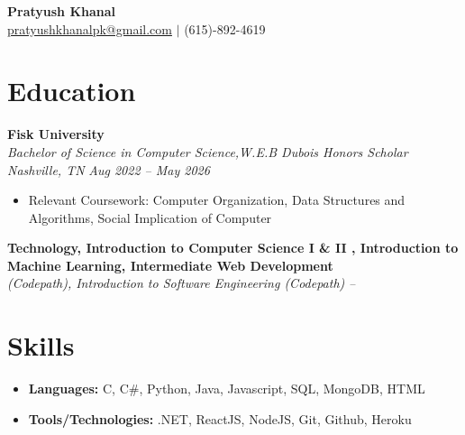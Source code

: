 \documentclass[letterpaper,10pt]{article}
\begin{document}
\begin{center}
  {\LARGE\bfseries\color{accent} Pratyush Khanal} \\[4pt]
  \small
  \href{mailto:pratyushkhanalpk@gmail.com}{pratyushkhanalpk@gmail.com}   $|$ (615)-892-4619      \end{center}

\section{Education}
\textbf{Fisk University} \hfill  \\
\textit{Bachelor of Science in Computer Science,W.E.B Dubois Honors Scholar Nashville, TN} \hfill \textit{Aug 2022 -- May 2026}
\begin{itemize}
  \item Relevant Coursework: Computer Organization, Data Structures and Algorithms, Social Implication of Computer
\end{itemize}
\textbf{Technology, Introduction to Computer Science I \& II , Introduction to Machine Learning, Intermediate Web Development} \hfill  \\
\textit{(Codepath), Introduction to Software Engineering (Codepath)} \hfill \textit{ -- }








\section{Skills}
\begin{itemize}[label={}]
  \item \textbf{Languages:} C, C\#, Python, Java, Javascript, SQL, MongoDB, HTML
  \item \textbf{Tools/Technologies:} .NET, ReactJS, NodeJS, Git, Github, Heroku
\end{itemize}
\end{document}
